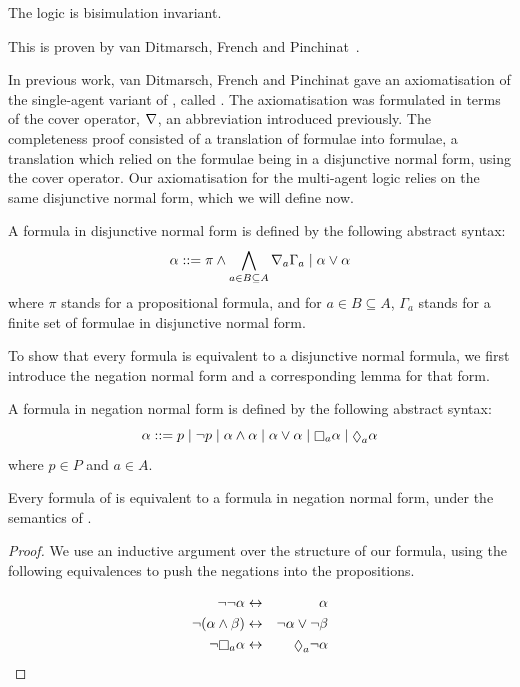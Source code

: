 
\begin{lemma}
The logic \logicKF{} is bisimulation invariant.
\end{lemma}

This is proven by van Ditmarsch, French and Pinchinat~\cite{french2010future}.


In previous work, van Ditmarsch, French and Pinchinat gave an axiomatisation of
the single-agent variant of \logicKF{}, called \logicKiF{}. The axiomatisation
was formulated in terms of the cover operator, $\nabla$, an abbreviation
introduced previously. The completeness proof consisted of a translation of
\logicKiF{} formulae into \logicKi{} formulae, a translation which relied on the
formulae being in a disjunctive normal form, using the cover operator. Our
axiomatisation for the multi-agent logic \logicKF{} relies on the same
disjunctive normal form, which we will define now.

\begin{definition}
A formula in disjunctive normal form is defined by the following abstract syntax:
$$
\alpha ::= \pi \land \bigwedge_{a \in B \subseteq A} \nabla_a \Gamma_a \mid \alpha \lor \alpha
$$
where $\pi$ stands for a propositional formula, and for $a \in B \subseteq A$,
$\Gamma_a$ stands for a finite set of formulae in disjunctive normal form.
\end{definition}

To show that every \lang{} formula is equivalent to a disjunctive normal
formula, we first introduce the negation normal form and a corresponding lemma
for that form.

\begin{definition}
A formula in negation normal form is defined by the following abstract syntax:
$$
\alpha ::= p \bnfalt 
\neg p \bnfalt
\alpha \land \alpha \bnfalt
\alpha \lor \alpha \bnfalt
\knows_a \alpha \bnfalt
\suspects_a \alpha
$$
where $p \in P$ and $a \in A$.
\end{definition}

\begin{lemma}
Every formula of \lang{} is equivalent to a formula in negation normal form,
under the semantics of \logicK{}.
\end{lemma}

\begin{proof}
We use an inductive argument over the structure of our formula, using the
following equivalences to push the negations into the propositions.

\begin{eqnarray*}
\neg \neg \alpha &\iff& \alpha\\
\neg (\alpha \land \beta) &\iff& \neg \alpha \lor \neg \beta\\
\neg \knows_a \alpha &\iff& \suspects_a \neg \alpha
\end{eqnarray*}
\end{proof}

